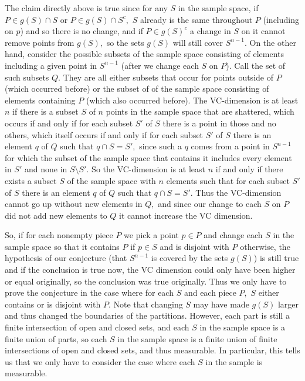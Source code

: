 \documentclass{article}
\begin{document}
The claim directly above is true since for any $S$ in the sample space, if $P \in g(S) \cap S$ or $P \in g(S) \cap S^c,$ $S$ already is the same throughout $P$ (including on $p$) and so there is no change, and if $P \in g(S)^c$ a change in $S$ on it cannot remove points from $g(S),$ so the sets $g(S)$ will still cover $S^{n - 1}.$ On the other hand, consider the possible subsets of the sample space consisting of elements including a given point in $S^{n - 1}$ (after we change each $S$ on $P$). Call the set of such subsets $Q.$ They are all either subsets that occur for points outside of $P$ (which occurred before) or the subset of of the sample space consisting of elements containing $P$ (which also occurred before). The VC-dimension is at least $n$ if there is a subset $S$ of $n$ points in the sample space that are shattered, which occurs if and only if for each subset $S'$ of $S$ there is a point in those and no others, which itself occurs if and only if for each subset $S'$ of $S$ there is an element $q$ of $Q$ such that $q \cap S = S',$ since such a $q$ comes from a point in $S^{n - 1}$ for which the subset of the sample space that contains it includes every element in $S'$ and none in $S \setminus S'.$ So the VC-dimension is at least $n$ if and only if there exists a subset $S$ of the sample space with $n$ elements such that for each subset $S'$ of $S$ there is an element $q$ of $Q$ such that $q \cap S = S'.$ Thus the VC-dimension cannot go up without new elements in $Q,$ and since our change to each $S$ on $P$ did not add new elements to $Q$ it cannot increase the VC dimension.

So, if for each nonempty piece $P$ we pick a point $p \in P$ and change each $S$ in the sample space so that it contains $P$ if $p \in S$ and is disjoint with $P$ otherwise, the hypothesis of our conjecture (that $S^{n - 1}$ is covered by the sets $g(S)$) is still true and if the conclusion is true now, the VC dimension could only have been higher or equal originally, so the conclusion was true originally. Thus we only have to prove the conjecture in the case where for each $S$ and each piece $P,$ $S$ either contains or is disjoint with $P.$ Note that changing $S$ may have made $g(S)$ larger and thus changed the boundaries of the partitions. However, each part is still a finite intersection of open and closed sets, and each $S$ in the sample space is a finite union of parts, so each $S$ in the sample space is a finite union of finite intersections of open and closed sets, and thus measurable. In particular, this tells us that we only have to consider the case where each $S$ in the sample is measurable.
\end{document}

